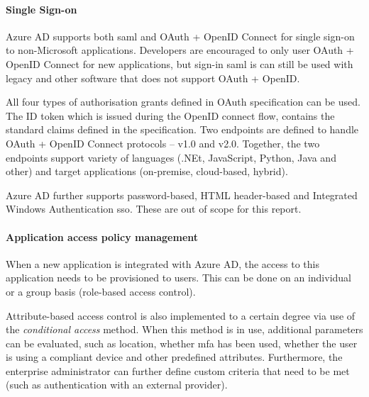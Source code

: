 
\paragraph{Single Sign-on} Azure AD supports both \acrshort{saml} and OAuth + OpenID Connect for single sign-on to non-Microsoft applications. Developers are encouraged to only user OAuth + OpenID Connect for new applications, but sign-in \acrshort{saml} is can still be used with legacy and other software that does not support OAuth + OpenID. 

All four types of authorisation grants defined in OAuth specification can be used. The ID token which is issued during the OpenID connect flow, contains the standard claims defined in the specification. Two endpoints are defined to handle OAuth + OpenID Connect protocols -- v1.0 and v2.0. Together, the two endpoints support variety of languages (.NEt, JavaScript, Python, Java and other) and target applications (on-premise, cloud-based, hybrid).

Azure AD further supports password-based, HTML header-based  and Integrated Windows Authentication \acrlong{sso}. These are out of scope for this report.

\paragraph{Application access policy management} When a new application is integrated with Azure AD, the access to this application needs to be provisioned to users. This can be done on an individual or a group basis (role-based access control). 

Attribute-based access control is also implemented to a certain degree via use of the \textit{conditional access} method. When this method is in use, additional parameters can be evaluated, such as location, whether \acrshort{mfa} has been used, whether the user is using a compliant device and other predefined attributes. Furthermore, the enterprise administrator can further define custom criteria that need to be met (such as authentication with an external provider).
